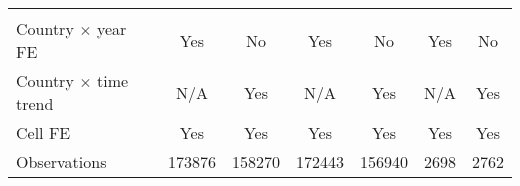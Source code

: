 {\begin{tabular}{l*{6}{c}}
\hline \\ Country $\times$ year FE&         Yes         &          No         &         Yes         &          No         &         Yes         &          No         \\
Country $\times$ time trend&         N/A         &         Yes         &         N/A         &         Yes         &         N/A         &         Yes         \\
Cell FE             &         Yes         &         Yes         &         Yes         &         Yes         &         Yes         &         Yes         \\
Observations        &      173876         &      158270         &      172443         &      156940         &        2698         &        2762         \\
\hline\hline
\end{tabular}
}
